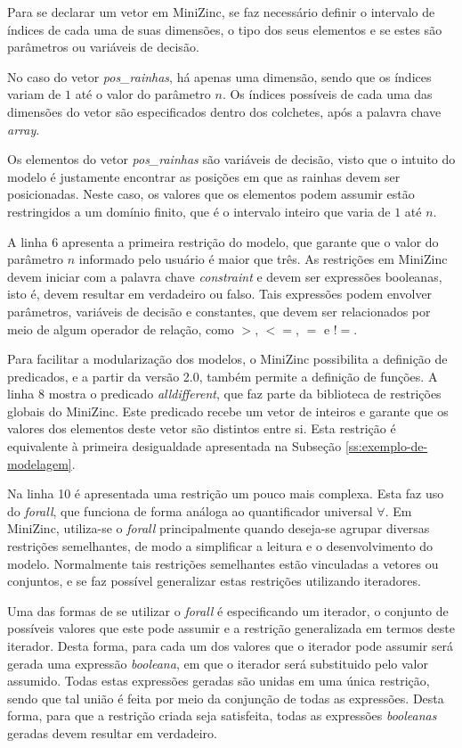 Para se declarar um vetor em MiniZinc, se faz necessário definir o intervalo de índices de cada uma de suas dimensões, o tipo dos seus elementos e se estes são parâmetros ou variáveis de decisão.

No caso do vetor \textit{pos\_rainhas}, há apenas uma dimensão, sendo que os índices variam de $1$ até o valor do parâmetro $n$. Os índices possíveis de cada uma das dimensões do vetor são especificados dentro dos colchetes, após a palavra chave \textit{array}.

Os elementos do vetor \textit{pos\_rainhas} são variáveis de decisão, visto que o intuito do modelo é justamente encontrar as posições em que as rainhas devem ser posicionadas. Neste caso, os valores que os elementos podem assumir estão restringidos a um domínio finito, que é o intervalo inteiro que varia de $1$ até $n$.

A linha 6 apresenta a primeira restrição do modelo, que garante que o valor do parâmetro $n$ informado pelo usuário é maior que três. As restrições em MiniZinc devem iniciar com a palavra chave \textit{constraint} e devem ser expressões booleanas, isto é, devem resultar em verdadeiro ou falso. Tais expressões podem envolver parâmetros, variáveis de decisão e constantes, que devem ser relacionados por meio de algum operador de relação, como $>$, $<=$, $=$ e $!=$.

Para facilitar a modularização dos modelos, o MiniZinc possibilita a definição de predicados, e a partir da versão 2.0, também permite a definição de funções. A linha 8 mostra o predicado \textit{alldifferent}, que faz parte da biblioteca de restrições globais do MiniZinc. Este predicado recebe um vetor de inteiros e garante que os valores dos elementos deste vetor são distintos entre si. Esta restrição é equivalente à primeira desigualdade apresentada na Subseção \ref{ss:exemplo-de-modelagem}.

Na linha 10 é apresentada uma restrição um pouco mais complexa. Esta faz uso do \textit{forall}, que funciona de forma análoga ao quantificador universal $\forall$. Em MiniZinc, utiliza-se o \textit{forall} principalmente quando deseja-se agrupar diversas restrições semelhantes, de modo a simplificar a leitura e o desenvolvimento do modelo. Normalmente tais restrições semelhantes estão vinculadas a vetores ou conjuntos, e se faz possível generalizar estas restrições utilizando iteradores.

Uma das formas de se utilizar o \textit{forall} é especificando um iterador, o conjunto de possíveis valores que este pode assumir e a restrição generalizada em termos deste iterador. Desta forma, para cada um dos valores que o iterador pode assumir será gerada uma expressão \textit{booleana}, em que o iterador será substituido pelo valor assumido. Todas estas expressões geradas são unidas em uma única restrição, sendo que tal união é feita por meio da conjunção de todas as expressões. Desta forma, para que a restrição criada seja satisfeita, todas as expressões \textit{booleanas} geradas devem resultar em verdadeiro.

